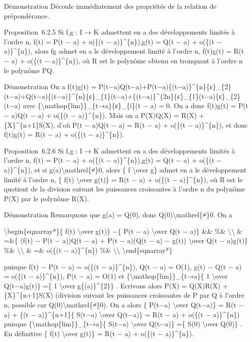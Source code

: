 \documentclass[]{article}
\begin{document}
Démonstration Découle immédiatement des propriétés de la relation de
prépondérance.

Proposition~6.2.5 Si f,g : I → K admettent en a des développements
limités à l'ordre n, f(t) = P(t − a) + o(\{(t − a)\}\^{}\{n\}),g(t) =
Q(t − a) + o(\{(t − a)\}\^{}\{n\}), alors fg admet en a le développement
limité à l'ordre n, f(t)g(t) = R(t − a) + o(\{(t − a)\}\^{}\{n\}), où R
est le polynôme obtenu en tronquant à l'ordre n le polynôme PQ.

Démonstration On a f(t)g(t) =
P(t−a)Q(t−a)+P(t−a)\{(t−a)\}\^{}\{n\}\{ε\}\_\{2\}(t−a)+Q(t−a)\{(t−a)\}\^{}\{n\}\{ε\}\_\{1\}(t−a)+\{(t−a)\}\^{}\{2n\}\{ε\}\_\{1\}(t−a)\{ε\}\_\{2\}(t−a)
avec \{\textbackslash{}mathop\{lim\}\}\_\{t→a\}\{ε\}\_\{i\}(t − a) = 0.
On a donc f(t)g(t) = P(t − a)Q(t − a) + o(\{(t − a)\}\^{}\{n\}). Mais on
a P(X)Q(X) = R(X) + \{X\}\^{}\{n+1\}S(X), d'où P(t − a)Q(t − a) = R(t −
a) + o(\{(t − a)\}\^{}\{n\}), et donc f(t)g(t) = R(t − a) + o(\{(t −
a)\}\^{}\{n\}).

Proposition~6.2.6 Si f,g : I → K admettent en a des développements
limités à l'ordre n, f(t) = P(t − a) + o(\{(t − a)\}\^{}\{n\}),g(t) =
Q(t − a) + o(\{(t − a)\}\^{}\{n\}), et si
g(a)\textbackslash{}mathrel\{≠\}0, alors \{ f \textbackslash{}over g\}
admet en a le développement limité à l'ordre n, \{ f(t)
\textbackslash{}over g(t)\} = R(t − a) + o(\{(t − a)\}\^{}\{n\}), où R
est le quotient de la division suivant les puissances croissantes à
l'ordre n du polynôme P(X) par le polynôme R(X).

Démonstration Remarquons que g(a) = Q(0), donc
Q(0)\textbackslash{}mathrel\{≠\}0. On a

\textbackslash{}begin\{eqnarray*\}\{ f(t) \textbackslash{}over g(t)\}
−\{ P(t − a) \textbackslash{}over Q(t − a)\} \&\& \%\&
\textbackslash{}\textbackslash{} \& =\&\{ (f(t) − P(t − a))Q(t − a) +
P(t − a)(Q(t − a) − g(t)) \textbackslash{}over Q(t − a)g(t)\} \%\&
\textbackslash{}\textbackslash{} \& =\& o(\{(t − a)\}\^{}\{n\}) \%\&
\textbackslash{}\textbackslash{} \textbackslash{}end\{eqnarray*\}

puisque f(t) − P(t − a) = o(\{(t − a)\}\^{}\{n\}), Q(t − a) = O(1), g(t)
− Q(t − a) = o(\{(t − a)\}\^{}\{n\}), P(t − a) = O(1) et
\{\textbackslash{}mathop\{lim\}\}\_\{t→a\}\{ 1 \textbackslash{}over
Q(t−a)g(t)\} =\{ 1 \textbackslash{}over g\{(a)\}\^{}\{2\}\} . Ecrivons
alors P(X) = Q(X)R(X) + \{X\}\^{}\{n+1\}S(X) (division suivant les
puissances croissantes de P par Q à l'ordre n, possible car
Q(0)\textbackslash{}mathrel\{≠\}0). On a alors \{ P(t−a)
\textbackslash{}over Q(t−a)\} = R(t − a) + \{(t − a)\}\^{}\{n+1\}\{
S(t−a) \textbackslash{}over Q(t−a)\} = R(t − a) + o(\{(t −
a)\}\^{}\{n\}) puisque \{\textbackslash{}mathop\{lim\}\}\_\{t→a\}\{
S(t−a) \textbackslash{}over Q(t−a)\} =\{ S(0) \textbackslash{}over
Q(0)\} . En définitive \{ f(t) \textbackslash{}over g(t)\} = R(t − a) +
o(\{(t − a)\}\^{}\{n\}).
\end{document}

